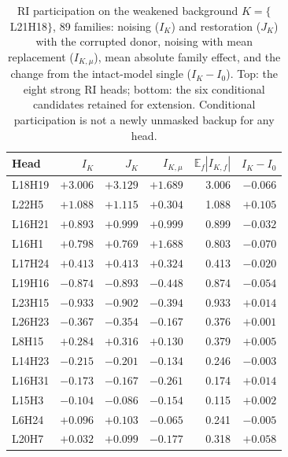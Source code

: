 \begin{table}[h]
\centering\scriptsize
\setlength{\tabcolsep}{3pt}
\begin{tabular}{@{}lrrrrr@{}}
\toprule
Head & $I_{K}$ & $J_{K}$ & $I_{K,\mu}$ & $\mathbb{E}_f|I_{K,f}|$ & $I_K-I_0$ \\
\midrule
L18H19 & $+3.006$ & $+3.129$ & $+1.689$ & 3.006 & $-0.066$ \\
L22H5  & $+1.088$ & $+1.115$ & $+0.304$ & 1.088 & $+0.105$ \\
L16H21 & $+0.893$ & $+0.999$ & $+0.999$ & 0.899 & $-0.032$ \\
L16H1  & $+0.798$ & $+0.769$ & $+1.688$ & 0.803 & $-0.070$ \\
L17H24 & $+0.413$ & $+0.413$ & $+0.324$ & 0.413 & $-0.020$ \\
L19H16 & $-0.874$ & $-0.893$ & $-0.448$ & 0.874 & $-0.054$ \\
L23H15 & $-0.933$ & $-0.902$ & $-0.394$ & 0.933 & $+0.014$ \\
L26H23 & $-0.367$ & $-0.354$ & $-0.167$ & 0.376 & $+0.001$ \\
\midrule
L8H15  & $+0.284$ & $+0.316$ & $+0.130$ & 0.379 & $+0.005$ \\
L14H23 & $-0.215$ & $-0.201$ & $-0.134$ & 0.246 & $-0.003$ \\
L16H31 & $-0.173$ & $-0.167$ & $-0.261$ & 0.174 & $+0.014$ \\
L15H3  & $-0.104$ & $-0.086$ & $-0.154$ & 0.115 & $+0.002$ \\
L6H24  & $+0.096$ & $+0.103$ & $-0.065$ & 0.241 & $-0.005$ \\
L20H7  & $+0.032$ & $+0.099$ & $-0.177$ & 0.318 & $+0.058$ \\
\bottomrule
\end{tabular}
\caption{RI participation on the weakened background $K=\{$L21H18$\}$, 89 families:
noising ($I_K$) and restoration ($J_K$) with the corrupted donor, noising with mean
replacement ($I_{K,\mu}$), mean absolute family effect, and the change from the
intact-model single ($I_K-I_0$). Top: the eight strong RI heads; bottom: the six
conditional candidates retained for extension. Conditional participation is not a
newly unmasked backup for any head.}
\label{tab:ri31-app}
\end{table}

